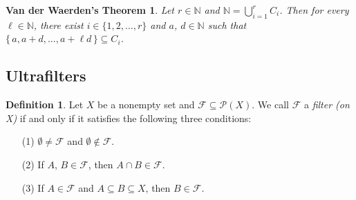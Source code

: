 \documentclass[12pt]{article}
\theoremstyle{plain}
\newtheorem*{vdw}{Van der Waerden's Theorem}
\theoremstyle{definition}
\newtheorem{defn}[thm]{Definition}
\newcommand{\bbN}{\mathbb{N}}
\newcommand{\calF}{\mathcal{F}}
\newcommand{\calP}{\mathcal{P}}
\begin{document}
\begin{vdw}
  Let $r \in \bbN$ and $\bbN = \bigcup_{i=1}^r C_i$.
  Then for every $\ell \in \bbN$, there exist $i \in \{1, 2, \ldots,
  r\}$ and $a$, $d \in \bbN$ such that $\{\, a, a+d, \ldots, a+\ell d
  \,\} \subseteq C_i$.
\end{vdw}

\subsection{Ultrafilters}
\begin{defn}
  Let $X$ be a nonempty set and $\calF \subseteq \calP(X)$.
  We call $\calF$ a \textsl{filter (on X)} if and only if it satisfies
  the following three conditions:
  \begin{itemize}
    \item[(1)] $\emptyset \ne \calF$ and $\emptyset \not\in \calF$.
    \item[(2)] If $A$, $B \in \calF$, then $A \cap B \in \calF$.
    \item[(3)] If $A \in \calF$ and $A \subseteq B \subseteq X$, then
      $B \in \calF$.
  \end{itemize}
\end{defn}

\theendnotes



\end{document}
